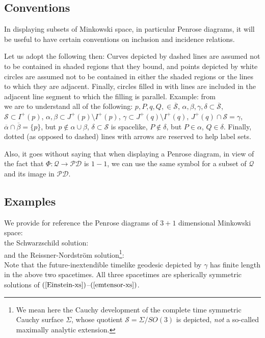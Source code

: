\documentclass{article}
\begin{document}

\subsection{Conventions}
\label{conv}
In displaying subsets of Minkowski space,
in particular Penrose diagrams, it will be useful to 
have certain conventions on inclusion and incidence relations.

Let us adopt the following then: Curves depicted by
dashed lines are assumed not to be contained in shaded regions that they
bound, and points depicted by white circles are assumed not to be
contained in either the shaded regions or the lines to which they
are adjacent. Finally, circles filled in with lines are included
in the adjacent line segment to which
the filling is parallel.
Example: from
\[

\]
we are to  understand all of the following: 
$p,P,q,Q,\in\overline{\mathcal{S}}$, 
$\alpha,\beta,\gamma,\delta\subset\overline{\mathcal{S}}$,
$\mathcal{S}\subset I^+(p)$, $\alpha, \beta\subset J^+(p)\setminus I^+(p)$,
$\gamma\subset J^+(q)\setminus I^+(q)$, $J^+(q)\cap \mathcal{S}=\gamma$,
$\overline\alpha\cap\overline\beta=\{p\}$, but
$p\not\in \alpha\cup\beta$, $\delta\subset \mathcal{S}$ is spacelike, 
$P\not\in\delta$, but $P\in\alpha$, $Q\in\delta$.
Finally, dotted (as opposed to dashed) lines with arrows are 
reserved to help label sets.

Also, it goes without saying that when displaying a Penrose diagram,
in view of the fact that $\Phi:\mathcal{Q}\to\mathcal{PD}$
is $1-1$, we can use the same symbol
for a subset of $\mathcal{Q}$ and its image in $\mathcal{PD}$.

\subsection{Examples}
\label{paradeigmata}
We provide for reference the Penrose diagrams of 
$3+1$ dimensional Minkowski space:
\[

\]
the Schwarzschild solution: 
\[

\]
and the 
Reissner-Nordstr\"om solution\footnote{We mean here
the Cauchy development of the complete time symmetric Cauchy surface $\Sigma$,
whose quotient $\mathcal{S}=\Sigma/SO(3)$ is depicted, \emph{not}
a so-called maximally analytic extension.}:
\[

\]
Note that the future-inextendible timelike geodesic depicted by $\gamma$ has
finite length in the above two spacetimes. All three spacetimes
are spherically symmetric solutions of $(\ref{Einstein-xs})$--$(\ref{emtensor-xs})$.
\newpage

\end{document}
